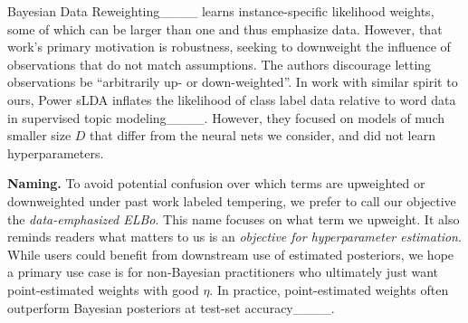 Bayesian Data Reweighting____ learns instance-specific likelihood weights, some of which can be larger than one and thus emphasize data. However, that work's primary motivation is robustness, seeking to downweight the influence of observations that do not match assumptions. The authors discourage letting observations be ``arbitrarily up- or down-weighted''. In work with similar spirit to ours, Power sLDA inflates the likelihood of class label data relative to word data in supervised topic modeling____. However, they 
focused on models of much smaller size $D$ that differ from the neural nets we consider, and did not learn hyperparameters.

\textbf{Naming.}
To avoid potential confusion over which terms are upweighted or downweighted under past work labeled tempering, we prefer to call our objective the \emph{data-emphasized ELBo}. This name focuses on what term we upweight. It also reminds readers what matters to us is an \emph{objective for hyperparameter estimation}. While users could benefit from downstream use of estimated posteriors, we hope a primary use case is for non-Bayesian practitioners who ultimately just want point-estimated weights with good $\eta$. In practice, point-estimated weights often outperform Bayesian posteriors at test-set accuracy____.